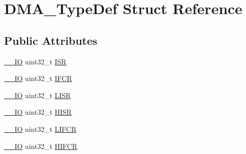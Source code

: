 \hypertarget{struct_d_m_a___type_def}{\section{D\-M\-A\-\_\-\-Type\-Def Struct Reference}
\label{struct_d_m_a___type_def}
}
\subsection*{Public Attributes}
\begin{DoxyCompactItemize}
\item 
\hyperlink{group___c_m_s_i_s__core__definitions_gaec43007d9998a0a0e01faede4133d6be}{\-\_\-\-\_\-\-I\-O} uint32\-\_\-t \hyperlink{struct_d_m_a___type_def_aa341a859df2f59bf6c0f7a000ab8734b}{I\-S\-R}
\item 
\hyperlink{group___c_m_s_i_s__core__definitions_gaec43007d9998a0a0e01faede4133d6be}{\-\_\-\-\_\-\-I\-O} uint32\-\_\-t \hyperlink{struct_d_m_a___type_def_a30576220ca1968e61666d92092e8911e}{I\-F\-C\-R}
\item 
\hyperlink{group___c_m_s_i_s__core__definitions_gaec43007d9998a0a0e01faede4133d6be}{\-\_\-\-\_\-\-I\-O} uint32\-\_\-t \hyperlink{struct_d_m_a___type_def_aacb4a0977d281bc809cb5974e178bc2b}{L\-I\-S\-R}
\item 
\hyperlink{group___c_m_s_i_s__core__definitions_gaec43007d9998a0a0e01faede4133d6be}{\-\_\-\-\_\-\-I\-O} uint32\-\_\-t \hyperlink{struct_d_m_a___type_def_a01a90a5fcd6459e10b81c0ab737dd2e3}{H\-I\-S\-R}
\item 
\hyperlink{group___c_m_s_i_s__core__definitions_gaec43007d9998a0a0e01faede4133d6be}{\-\_\-\-\_\-\-I\-O} uint32\-\_\-t \hyperlink{struct_d_m_a___type_def_a11adb689c874d38b49fa44990323b653}{L\-I\-F\-C\-R}
\item 
\hyperlink{group___c_m_s_i_s__core__definitions_gaec43007d9998a0a0e01faede4133d6be}{\-\_\-\-\_\-\-I\-O} uint32\-\_\-t \hyperlink{struct_d_m_a___type_def_a1e4f50b935bab2520788ae936f2e55c1}{H\-I\-F\-C\-R}
\end{DoxyCompactItemize}


